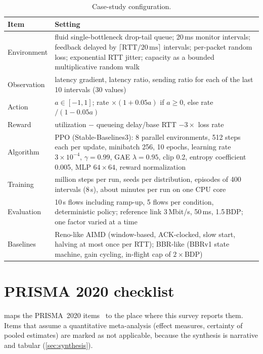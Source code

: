 \begin{table}[ht]
\centering
\caption{Case-study configuration.}
\label{tab:case-config}
\small
\begin{tabularx}{\linewidth}{@{}lY@{}}
\toprule
Item & Setting \\
\midrule
Environment & fluid single-bottleneck drop-tail queue; 20\,ms monitor intervals; feedback delayed by $\lceil \text{RTT}/20\,\text{ms}\rceil$ intervals; per-packet random loss; exponential RTT jitter; capacity as a bounded multiplicative random walk \\
Observation & latency gradient, latency ratio, sending ratio for each of the last 10 intervals (30 values) \\
Action & $a\in[-1,1]$; rate $\times(1+0.05a)$ if $a\ge 0$, else rate $/(1-0.05a)$ \\
Reward & utilization $-$ queueing delay/base RTT $- 3\times$ loss rate \\
Algorithm & PPO (Stable-Baselines3): 8 parallel environments, 512 steps each per update, minibatch 256, 10 epochs, learning rate $3\times10^{-4}$, $\gamma=0.99$, GAE $\lambda=0.95$, clip 0.2, entropy coefficient 0.005, MLP $64\times 64$, reward normalization \\
Training & \nCsSteps{} million steps per run, \nCsSeeds{} seeds per distribution, episodes of 400 intervals (8\,s), about \nCsTrainMinutes{} minutes per run on one CPU core \\
Evaluation & 10\,s flows including ramp-up, 5 flows per condition, deterministic policy; reference link 3\,Mbit/s, 50\,ms, 1.5\,BDP; one factor varied at a time \\
Baselines & Reno-like AIMD (window-based, ACK-clocked, slow start, halving at most once per RTT); BBR-like (BBRv1 state machine, gain cycling, in-flight cap of $2\times$BDP) \\
\bottomrule
\end{tabularx}
\end{table}

\chapter{PRISMA 2020 checklist}
\label{app:prisma}

 maps the PRISMA~2020 items~\cite{page2021prisma} to the place where this survey reports them. Items that assume a quantitative meta-analysis (effect measures, certainty of pooled estimates) are marked as not applicable, because the synthesis is narrative and tabular (\cref{sec:synthesis}).

